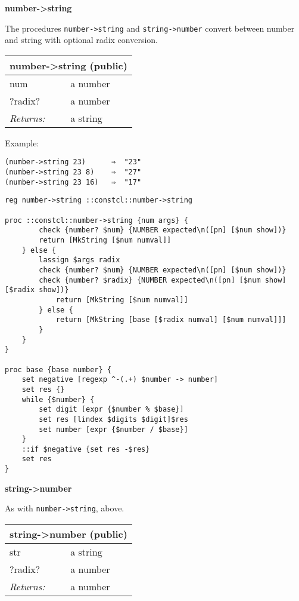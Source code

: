 \documentclass{report}
\begin{document}
\textbf{number->string}


The procedures \texttt{number->string} and \texttt{string->number} convert between number and string with optional radix conversion.

\begin{tabular}{ |l l| }
\hline
\multicolumn{2}{|l|}{number->string (public)} \\
\hline
num & a number \\
?radix? & a number \\
\textit{Returns:} & a string \\
\hline
\end{tabular}


Example:

\noindent\makebox[\linewidth]{\rule{\linewidth}{0.4pt}}
\begin{lstlisting}
(number->string 23)      ⇒  "23"
(number->string 23 8)    ⇒  "27"
(number->string 23 16)   ⇒  "17"
\end{lstlisting}
\noindent\makebox[\linewidth]{\rule{\linewidth}{0.4pt}}
\noindent\makebox[\linewidth]{\rule{\linewidth}{0.4pt}}
\begin{lstlisting}
reg number->string ::constcl::number->string
 
proc ::constcl::number->string {num args} {
        check {number? $num} {NUMBER expected\n([pn] [$num show])}
        return [MkString [$num numval]]
    } else {
        lassign $args radix
        check {number? $num} {NUMBER expected\n([pn] [$num show])}
        check {number? $radix} {NUMBER expected\n([pn] [$num show] [$radix show])}
            return [MkString [$num numval]]
        } else {
            return [MkString [base [$radix numval] [$num numval]]]
        }
    }
}
 
proc base {base number} {
    set negative [regexp ^-(.+) $number -> number]
    set res {}
    while {$number} {
        set digit [expr {$number % $base}]
        set res [lindex $digits $digit]$res
        set number [expr {$number / $base}]
    }
    ::if $negative {set res -$res}
    set res
}
\end{lstlisting}
\noindent\makebox[\linewidth]{\rule{\linewidth}{0.4pt}}

\textbf{string->number}


As with \texttt{number->string}, above.

\begin{tabular}{ |l l| }
\hline
\multicolumn{2}{|l|}{string->number (public)} \\
\hline
str & a string \\
?radix? & a number \\
\textit{Returns:} & a number \\
\hline
\end{tabular}
\end{document}
